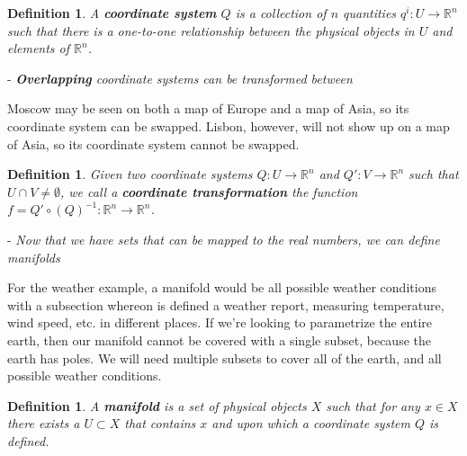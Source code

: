 \documentclass{book}
\newtheorem{defn}[equation]{Definition}
\begin{document}
\begin{defn}
	A \textbf{coordinate system} $Q$ is a collection of $n$ quantities $q^i : U \to \mathbb{R}^n$ such that there is a one-to-one relationship between the physical objects in $U$ and elements of $\mathbb{R}^n$.
\end{defn}


- \emph{\textbf{Overlapping} coordinate systems can be transformed between}

Moscow may be seen on both a map of Europe and a map of Asia, so its coordinate system can be swapped. Lisbon, however, will not show up on a map of Asia, so its coordinate system cannot be swapped. 


\begin{defn}
	Given two coordinate systems  $Q : U \to \mathbb{R}^n$ and $Q' : V \to \mathbb{R}^n$ such that $U \cap V \neq \emptyset$, we call a \textbf{coordinate transformation} the function $f = Q' \circ (Q)^{-1} : \mathbb{R}^n \to \mathbb{R}^n$.
\end{defn}




- \emph{Now that we have sets that can be mapped to the real numbers, we can define manifolds}

For the weather example, a manifold would be all possible weather conditions with a subsection whereon is defined a weather report, measuring temperature, wind speed, etc. in different places. If we're looking to parametrize the entire earth, then our manifold cannot be covered with a single subset, because the earth has poles. We will need multiple subsets to cover all of the earth, and all possible weather conditions. 


 
\begin{defn}
	A \textbf{manifold} is a set of physical objects $X$ such that for any $x \in X$ there exists a $U \subset X$ that contains $x$ and upon which a coordinate system $Q$ is defined.
\end{defn}
\end{document}
